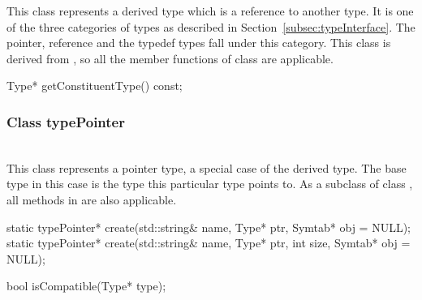 
This class represents a derived type which is a reference to another type. It is one of the three categories of types as described in Section~\ref{subsec:typeInterface}. The pointer, reference and the typedef types fall under this category. This class is derived from , so all the member functions of class  are applicable.


\begin{apient}
Type* getConstituentType() const;
\end{apient}

\subsubsection{Class typePointer}


\mbox{ }\\

This class represents a pointer type, a special case of the derived type. The base type in this case is the type this particular type points to. As a subclass of class , all methods in  are also applicable.


\begin{apient}
static typePointer* create(std::string& name,
                           Type* ptr,
                           Symtab* obj = NULL);
static typePointer* create(std::string& name,
                           Type* ptr,
                           int size,
                           Symtab* obj = NULL);
\end{apient}

\begin{apient}
bool isCompatible(Type* type);
\end{apient}

